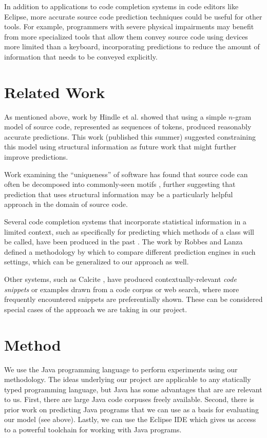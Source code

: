 \documentclass{article} %
\begin{document}
In addition to applications to code completion systems in code editors like Eclipse, more accurate source code prediction techniques could be useful for other tools. For example, programmers with severe physical impairments may benefit from more specialized tools that allow them convey source code using devices more limited than a keyboard, incorporating predictions to reduce the amount of information that needs to be conveyed explicitly.

\section*{Related Work}
As mentioned above, work by Hindle et al. \cite{Hindle:2012:NS:2337223.2337322} showed that using a simple $n$-gram model of source code, represented as sequences of tokens, produced reasonably accurate predictions. This work (published this summer) suggested constraining this model using structural information as future work that might further improve predictions. 

Work examining the ``uniqueness'' of software has found that source code can often be decomposed into commonly-seen motifs \cite{Gabel:2010:FSE}, further suggesting that prediction that uses structural information may be a particularly helpful approach in the domain of source code.

Several code completion systems that incorporate statistical information in a limited context, such as specifically for predicting which methods of a class will be called, have been produced in the past \cite{Bruch:2009:LEI:1595696.1595728,robbes_how_2008}. The work by Robbes and Lanza \cite{robbes_how_2008} defined a methodology by which to compare different prediction engines in such settings, which can be generalized to our approach as well. 

Other systems, such as Calcite \cite{mooty_calcite:_2010}, have produced contextually-relevant {\em code snippets} or examples drawn from a code corpus or web search, where more frequently encountered snippets are preferentially shown. These can be considered special cases of the approach we are taking in our project.


\section*{Method}
We use the Java programming language to perform experiments using our methodology. The ideas underlying our project are applicable to any statically typed programming language, but Java has some advantages that are are relevant to us. First, there are large Java code corpuses freely available. Second, there is prior work on predicting Java programs that we can use as a basis for evaluating our model (see above). Lastly, we can use the Eclipse IDE which gives us access to a powerful toolchain for working with Java programs.
\end{document}

